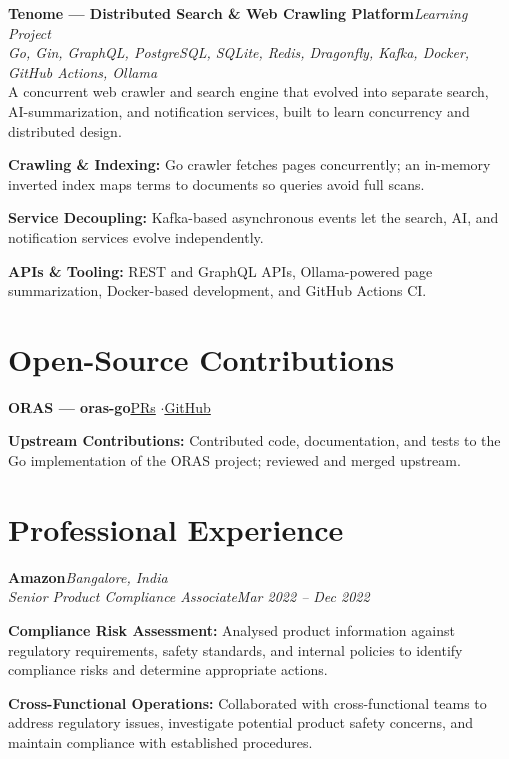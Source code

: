 \documentclass[10pt,a4paper]{article}
\begin{document}
\noindent\textbf{Tenome --- Distributed Search \& Web Crawling Platform}\hfill\textit{Learning Project} \enspace\textbar{}\\[1.5pt]
\noindent\textit{Go, Gin, GraphQL, PostgreSQL, SQLite, Redis, Dragonfly, Kafka, Docker, GitHub Actions, Ollama}\\[2.5pt]
A concurrent web crawler and search engine that evolved into separate search, AI-summarization, and notification services, built to learn concurrency and distributed design.
\begin{resumelist}
  \item \textbf{Crawling \& Indexing:} Go crawler fetches pages concurrently; an in-memory inverted index maps terms to documents so queries avoid full scans.
  \item \textbf{Service Decoupling:} Kafka-based asynchronous events let the search, AI, and notification services evolve independently.
  \item \textbf{APIs \& Tooling:} REST and GraphQL APIs, Ollama-powered page summarization, Docker-based development, and GitHub Actions CI.
\end{resumelist}

\section*{Open-Source Contributions}
\noindent\textbf{ORAS --- oras-go}\hfill{\small\href{https://github.com/oras-project/oras-go/pulls?q=is\%3Apr+state\%3Aclosed+author\%3Aaswinsreeraj}{\color{linkblue}PRs} \enspace$\cdot$\enspace \href{https://github.com/oras-project/oras-go}{\color{linkblue}GitHub}}
\begin{resumelist}
  \item \textbf{Upstream Contributions:} Contributed code, documentation, and tests to the Go implementation of the ORAS project; reviewed and merged upstream.
\end{resumelist}

\section*{Professional Experience}

\noindent\textbf{Amazon}\hfill\textit{Bangalore, India}\\[1.5pt]
\noindent\textit{Senior Product Compliance Associate}\hfill\textit{Mar 2022 -- Dec 2022}
\begin{resumelist}
  \item \textbf{Compliance Risk Assessment:} Analysed product information against regulatory requirements, safety standards, and internal policies to identify compliance risks and determine appropriate actions.
  \item \textbf{Cross-Functional Operations:} Collaborated with cross-functional teams to address regulatory issues, investigate potential product safety concerns, and maintain compliance with established procedures.
\end{resumelist}
\end{document}
